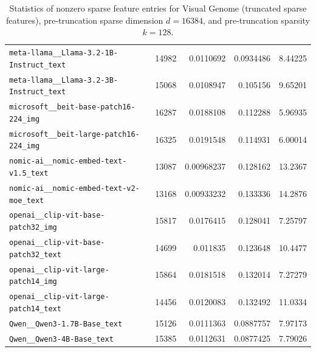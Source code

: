 \begin{table}[htbp]
{\begin{tabular}{lrrrr}
\texttt{meta-llama\_\_Llama-3.2-1B-Instruct\_text} & 14982 & 0.0110692 & 0.0934486 & 8.44225 \\
\texttt{meta-llama\_\_Llama-3.2-3B-Instruct\_text} & 15068 & 0.0108947 & 0.105156 & 9.65201 \\
\texttt{microsoft\_\_beit-base-patch16-224\_img} & 16287 & 0.0188108 & 0.112288 & 5.96935 \\
\texttt{microsoft\_\_beit-large-patch16-224\_img} & 16325 & 0.0191548 & 0.114931 & 6.00014 \\
\texttt{nomic-ai\_\_nomic-embed-text-v1.5\_text} & 13087 & 0.00968237 & 0.128162 & 13.2367 \\
\texttt{nomic-ai\_\_nomic-embed-text-v2-moe\_text} & 13168 & 0.00933232 & 0.133336 & 14.2876 \\
\texttt{openai\_\_clip-vit-base-patch32\_img} & 15817 & 0.0176415 & 0.128041 & 7.25797 \\
\texttt{openai\_\_clip-vit-base-patch32\_text} & 14699 & 0.011835 & 0.123648 & 10.4477 \\
\texttt{openai\_\_clip-vit-large-patch14\_img} & 15864 & 0.0181518 & 0.132014 & 7.27279 \\
\texttt{openai\_\_clip-vit-large-patch14\_text} & 14456 & 0.0120083 & 0.132492 & 11.0334 \\
\texttt{Qwen\_\_Qwen3-1.7B-Base\_text} & 15126 & 0.0111363 & 0.0887757 & 7.97173 \\
\texttt{Qwen\_\_Qwen3-4B-Base\_text} & 15385 & 0.0112631 & 0.0877425 & 7.79026 \\
\bottomrule
\end{tabular}
}%
\caption{Statistics of nonzero sparse feature entries for Visual Genome (truncated sparse features), pre-truncation sparse dimension $d=16384$, and pre-truncation sparsity $k=128$.}
\label{tab:sparse-feature-entries-visual-genome-truncated-d16384-k128}
\end{table}
